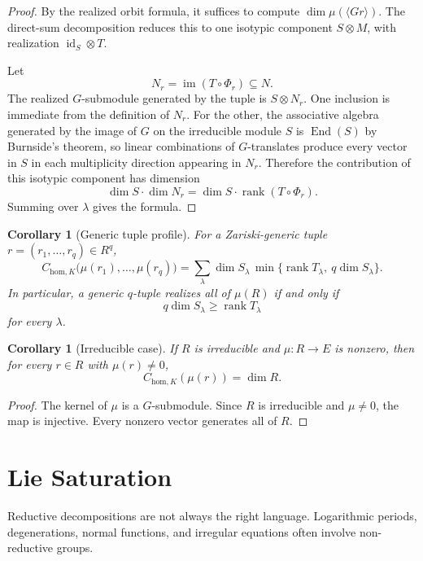 \documentclass[11pt]{article}
\newtheorem{corollary}[theorem]{Corollary}
\DeclareMathOperator{\rank}{rank}
\begin{document}
\begin{proof}
By the realized orbit formula, it suffices to compute \(\dim\mu(\langle G r\rangle)\). The direct-sum decomposition reduces this to one isotypic component \(S\otimes M\), with realization \(\operatorname{id}_S\otimes T\).

Let
\[
N_r=\operatorname{im}(T\circ\Phi_r)\subseteq N.
\]
The realized \(G\)-submodule generated by the tuple is \(S\otimes N_r\). One inclusion is immediate from the definition of \(N_r\). For the other, the associative algebra generated by the image of \(G\) on the irreducible module \(S\) is \(\operatorname{End}(S)\) by Burnside's theorem, so linear combinations of \(G\)-translates produce every vector in \(S\) in each multiplicity direction appearing in \(N_r\). Therefore the contribution of this isotypic component has dimension
\[
\dim S\cdot \dim N_r
=
\dim S\cdot \rank(T\circ\Phi_r).
\]
Summing over \(\lambda\) gives the formula.
\end{proof}

\begin{corollary}[Generic tuple profile]
For a Zariski-generic tuple \(r=(r_1,\ldots,r_q)\in R^q\),
\[
C_{\mathrm{hom},K}\bigl(\mu(r_1),\ldots,\mu(r_q)\bigr)
=
\sum_\lambda
\dim S_\lambda\,
\min\{\rank T_\lambda,\ q\dim S_\lambda\}.
\]
In particular, a generic \(q\)-tuple realizes all of \(\mu(R)\) if and only if
\[
q\dim S_\lambda\ge \rank T_\lambda
\]
for every \(\lambda\).
\end{corollary}

\begin{corollary}[Irreducible case]
If \(R\) is irreducible and \(\mu:R\to E\) is nonzero, then for every \(r\in R\) with \(\mu(r)\ne0\),
\[
C_{\mathrm{hom},K}(\mu(r))=\dim R.
\]
\end{corollary}

\begin{proof}
The kernel of \(\mu\) is a \(G\)-submodule. Since \(R\) is irreducible and \(\mu\ne0\), the map is injective. Every nonzero vector generates all of \(R\).
\end{proof}

\section{Lie Saturation}

Reductive decompositions are not always the right language. Logarithmic periods, degenerations, normal functions, and irregular equations often involve non-reductive groups.
\end{document}
